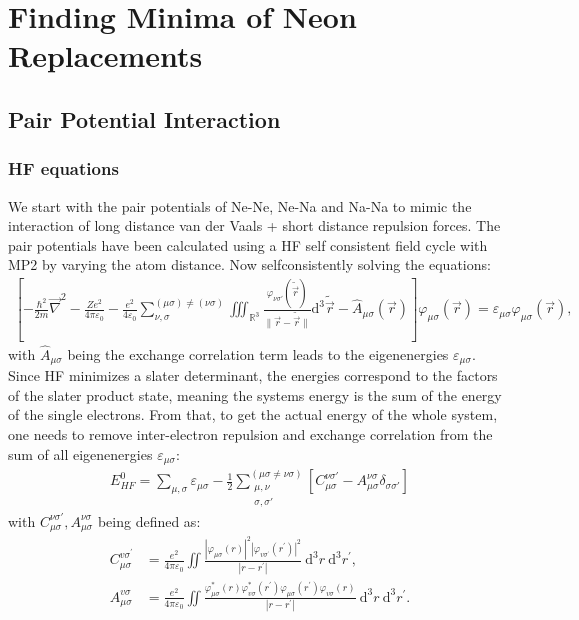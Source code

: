 
\chapter{Finding Minima of Neon Replacements}
\label{chap:Erstes Kapitel}
\section{Pair Potential Interaction}
\subsection{\ac{HF} equations}
We start with the pair potentials of Ne-Ne, Ne-Na and Na-Na to mimic the interaction of long distance van der Vaals + short distance repulsion forces. The pair potentials have been calculated using a \ac{HF} self consistent field cycle with \ac{MP2} by varying the atom distance. Now selfconsistently solving the equations:\\
\begin{align}
	\left[-\frac{\hbar^2}{2m}\vec{\nabla}^2-\frac{Ze^2}{4\pi\varepsilon_0}-\frac{e^2}{4\varepsilon_0}\sum_{\nu,\sigma}^{(\mu\sigma)\neq(\nu\sigma)}\iiint_{\mathbb{R}^3}\frac{\varphi_{\nu\sigma'}(\tilde{\vec{r}})}{\|\vec{r}-\tilde{\vec{r}}\|}\mathrm{d}^3\tilde{\vec{r}}-\hat{A}_{\mu\sigma}(\vec{r})\right]\varphi_{\mu\sigma}(\vec{r})=\varepsilon_{\mu\sigma}\varphi_{\mu\sigma}(\vec{r}),
\end{align}
with $\hat{A}_{\mu\sigma}$ being the exchange correlation term leads to the eigenenergies $\varepsilon_{\mu\sigma}$. Since \ac{HF} 
minimizes a slater determinant, the energies correspond to the factors of the slater product state, meaning the systems energy is the sum of the energy of the single electrons. From that, to get the actual energy of the whole system, one needs to remove inter-electron repulsion and exchange correlation from the sum of all eigenenergies $\varepsilon_{\mu\sigma}$:
\begin{align}
	E_{HF}^0 = \sum_{\mu,\sigma}\varepsilon_{\mu\sigma}-\frac{1}{2}\sum_{\substack{\mu,\nu\\\sigma,\sigma'}}^{(\mu\sigma\neq\nu\sigma)}\left[C_{\mu\sigma}^{\nu\sigma'}-A_{\mu\sigma}^{\nu\sigma}\delta_{\sigma\sigma'}\right]
\end{align}
with $C_{\mu\sigma}^{\nu\sigma'},A_{\mu\sigma}^{\nu\sigma}$ being defined as:
\begin{align}
	C_{\mu \sigma}^{v \sigma^{\prime}}&=\frac{e^2}{4 \pi \varepsilon_0} \iint  \frac{\left|\varphi_{\mu \sigma}(r)\right|^2\left|\varphi_{v \sigma^{\prime}}\left(r^{\prime}\right)\right|^2}{\left|r-r^{\prime}\right|}\mathrm{~d}^3 r \mathrm{~d}^3 r^{\prime},
	\\
	A_{\mu \sigma}^{v \sigma}&=\frac{e^2}{4 \pi \varepsilon_0} \iint \frac{\varphi_{\mu \sigma}^*(r) \varphi_{v \sigma}^*\left(r^{\prime}\right) \varphi_{\mu \sigma}\left(r^{\prime}\right) \varphi_{v \sigma}(r)}{\left|r-r^{\prime}\right|} \mathrm{~d}^3 r \mathrm{~d}^3 r^{\prime}.
\end{align}
